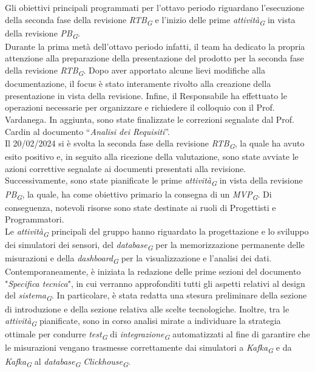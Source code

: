 Gli obiettivi principali programmati per l’ottavo periodo riguardano l’esecuzione della seconda fase della revisione \textit{RTB}\textsubscript{\textit{G}} e l’inizio delle prime \textit{attività}\textsubscript{\textit{G}} in vista della revisione \textit{PB}\textsubscript{\textit{G}}. \\
Durante la prima metà dell’ottavo periodo infatti, il team ha dedicato la propria attenzione alla preparazione della presentazione del prodotto per la seconda fase della revisione \textit{RTB}\textsubscript{\textit{G}}. Dopo aver apportato alcune lievi modifiche alla documentazione, il focus è stato interamente rivolto alla creazione della presentazione in vista della revisione. Infine, il Responsabile ha effettuato le operazioni necessarie per organizzare e richiedere il colloquio con il Prof. Vardanega. In aggiunta, sono state finalizzate le correzioni segnalate dal Prof. Cardin al documento “\textit{Analisi dei Requisiti}”. \\
Il 20/02/2024 si è svolta la seconda fase della revisione \textit{RTB}\textsubscript{\textit{G}}, la quale ha avuto esito positivo e, in seguito alla ricezione della valutazione, sono state avviate le azioni correttive segnalate ai documenti presentati alla revisione. \\
Successivamente, sono state pianificate le prime \textit{attività}\textsubscript{\textit{G}} in vista della revisione \textit{PB}\textsubscript{\textit{G}}, la quale, ha come obiettivo primario la consegna di un \textit{MVP}\textsubscript{\textit{G}}. Di conseguenza, notevoli risorse sono state destinate ai ruoli di Progettisti e Programmatori. \\
Le \textit{attività}\textsubscript{\textit{G}} principali del gruppo hanno riguardato la progettazione e lo sviluppo dei simulatori dei sensori, del \textit{database}\textsubscript{\textit{G}} per la memorizzazione permanente delle misurazioni e della \textit{dashboard}\textsubscript{\textit{G}} per la visualizzazione e l’analisi dei dati.
Contemporaneamente, è iniziata la redazione delle prime sezioni del documento "\textit{Specifica tecnica}", in cui verranno approfonditi tutti gli aspetti relativi al design del \textit{sistema}\textsubscript{\textit{G}}. In particolare, è stata redatta una stesura preliminare della sezione di introduzione e della sezione relativa alle scelte tecnologiche.
Inoltre, tra le \textit{attività}\textsubscript{\textit{G}} pianificate, sono in corso analisi mirate a individuare la strategia ottimale per condurre \textit{test}\textsubscript{\textit{G}} di \textit{integrazione}\textsubscript{\textit{G}} automatizzati al fine di garantire che le misurazioni vengano trasmesse correttamente dai simulatori a \textit{Kafka}\textsubscript{\textit{G}} e da \textit{Kafka}\textsubscript{\textit{G}} al \textit{database}\textsubscript{\textit{G}} \textit{Clickhouse}\textsubscript{\textit{G}}. \\
